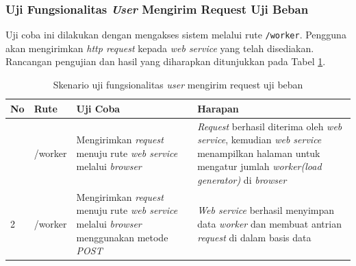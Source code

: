 		\subsubsection{Uji Fungsionalitas \textit{User} Mengirim Request Uji Beban}
			Uji coba ini dilakukan dengan mengakses sistem melalui rute \texttt{/worker}. Pengguna akan mengirimkan \textit{http request} kepada \textit{web service} yang telah disediakan. Rancangan pengujian dan hasil yang diharapkan ditunjukkan pada Tabel \ref{tabelujirequest}.
			\begin{longtable}{|p{}|p{}|p{0.30\textwidth}|p{}|}
				\caption{Skenario uji fungsionalitas \textit{user} mengirim request uji beban} \label{tabelujirequest} \\ \hline
				\textbf{No} & \textbf{Rute} & \textbf{Uji Coba} & \textbf{Harapan} \\ \hline
				\endhead
				\endfoot
				\endlastfoot
				1 & /worker & Mengirimkan \textit{request} menuju rute \textit{web service} melalui \textit{browser} & \textit{Request} berhasil diterima oleh \textit{web service}, kemudian \textit{web service} menampilkan halaman untuk mengatur jumlah \textit{worker(load generator)} di \textit{browser} \\ \hline
				2 & /worker & Mengirimkan \textit{request} menuju rute \textit{web service} melalui \textit{browser} menggunakan metode \textit{POST} & \textit{Web service} berhasil menyimpan data \textit{worker} dan membuat antrian \textit{request} di dalam basis data  \\ \hline
			\end{longtable}
		
